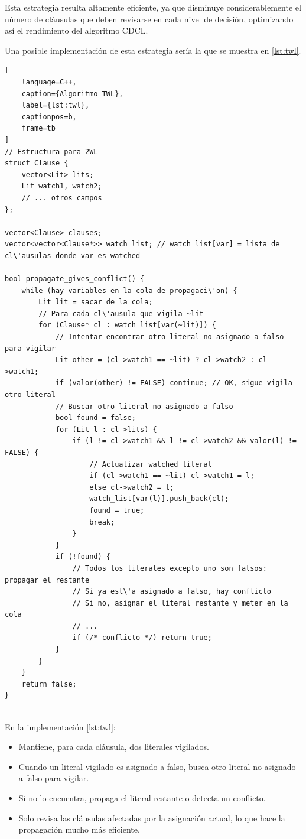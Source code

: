 Esta estrategia resulta altamente eficiente, ya que disminuye considerablemente el n\'umero de cl\'ausulas que deben revisarse en cada nivel de decisi\'on, optimizando as\'i el rendimiento del algoritmo CDCL.

Una posible implementaci\'on de esta estrategia ser\'ia la que se muestra en \ref{lst:twl}.

\begin{lstlisting}[
    language=C++,
    caption={Algoritmo TWL},
    label={lst:twl},
    captionpos=b,
    frame=tb
]
// Estructura para 2WL
struct Clause {
    vector<Lit> lits;
    Lit watch1, watch2;
    // ... otros campos
};

vector<Clause> clauses;
vector<vector<Clause*>> watch_list; // watch_list[var] = lista de cl\'ausulas donde var es watched

bool propagate_gives_conflict() {
    while (hay variables en la cola de propagaci\'on) {
        Lit lit = sacar de la cola;
        // Para cada cl\'ausula que vigila ~lit
        for (Clause* cl : watch_list[var(~lit)]) {
            // Intentar encontrar otro literal no asignado a falso para vigilar
            Lit other = (cl->watch1 == ~lit) ? cl->watch2 : cl->watch1;
            if (valor(other) != FALSE) continue; // OK, sigue vigila otro literal
            // Buscar otro literal no asignado a falso
            bool found = false;
            for (Lit l : cl->lits) {
                if (l != cl->watch1 && l != cl->watch2 && valor(l) != FALSE) {
                    // Actualizar watched literal
                    if (cl->watch1 == ~lit) cl->watch1 = l;
                    else cl->watch2 = l;
                    watch_list[var(l)].push_back(cl);
                    found = true;
                    break;
                }
            }
            if (!found) {
                // Todos los literales excepto uno son falsos: propagar el restante
                // Si ya est\'a asignado a falso, hay conflicto
                // Si no, asignar el literal restante y meter en la cola
                // ...
                if (/* conflicto */) return true;
            }
        }
    }
    return false;
}


\end{lstlisting}

En la implementaci\'on \ref{lst:twl}:
\begin{itemize}
    \item Mantiene, para cada cláusula, dos literales vigilados.
    \item Cuando un literal vigilado es asignado a falso, busca otro literal no asignado a falso para vigilar.
    \item Si no lo encuentra, propaga el literal restante o detecta un conflicto.
    \item Solo revisa las cláusulas afectadas por la asignación actual, lo que hace la propagación mucho más eficiente.
\end{itemize}

